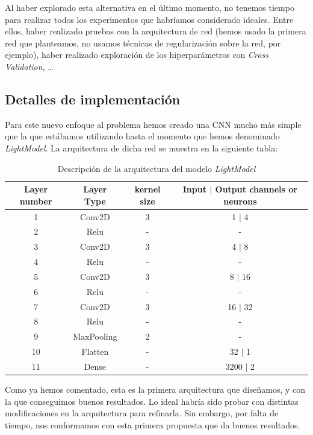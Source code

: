 \documentclass[11pt]{article}
\begin{document}
Al haber explorado esta alternativa en el último momento, no tenemos tiempo para realizar todos los experimentos que habríamos considerado ideales. Entre ellos, haber realizado pruebas con la arquitectura de red (hemos usado la primera red que planteamos, no usamos técnicas de regularización sobre la red, por ejemplo), haber realizado exploración de los hiperparámetros con \emph{Cross Validation}, \ldots

\subsection{Detalles de implementación}

Para este nuevo enfoque al problema hemos creado una CNN mucho más simple que la que estábamos utilizando hasta el momento que hemos denominado \emph{LightModel}. La arquitectura de dicha red se muestra en la siguiente tabla:

\begin{table}[H]
\begin{center}
    
    \begin{tabular}{|c|c|c|c|}
        \hline
        Layer number & Layer Type & kernel size &  Input $|$ Output channels or neurons \\
        \hline
        1 & Conv2D & 3 & 1 $|$ 4 \\ 
        2 & Relu & - & - \\
        3 & Conv2D & 3 & 4 $|$ 8 \\ 
        4 & Relu & - & - \\
        5 & Conv2D & 3 & 8 $|$ 16 \\ 
        6 & Relu & - & - \\
        7 & Conv2D & 3 & 16 $|$ 32 \\ 
        8 & Relu & - & - \\
        9 & MaxPooling & 2 & - \\
        10 & Flatten & - & 32 $|$ 1 \\
        11 & Dense & - & 3200 $|$ 2 \\
    \hline
    \end{tabular}
\end{center}
    \caption{Descripción de la arquitectura del modelo \emph{LightModel}}
\end{table}

Como ya hemos comentado, esta es la primera arquitectura que diseñamos, y con la que conseguimos buenos resultados. Lo ideal habría sido probar con distintas modificaciones en la arquitectura para refinarla. Sin embargo, por falta de tiempo, nos conformamos con esta primera propuesta que da buenos resultados.
\end{document}
